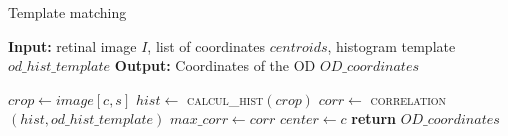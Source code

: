 \begin{algorithm}[!htbp]

	\caption{Template matching}
	\label{alg:templatematching}
	{\fontsize{10}{9.5}\selectfont
	\begin{algorithmic}[1]
		\State \textbf{Input:} retinal image $I$, list of coordinates $centroids$, histogram template $od\_hist\_template$ 
		\State \textbf{Output:} Coordinates of the OD $OD\_coordinates$
		\medbreak
		

				\State $crop \gets image[c, s]$
				\State $hist \gets$ \textsc{calcul\_hist}$(crop)$
				\State $corr \gets$ \textsc{correlation}$(hist, od\_hist\_template)$					
					\State $max\_corr \gets corr$
					\State $center \gets c$
				\EndIf
			\EndFor
			\State \textbf{return} $OD\_coordinates$
		\EndFunction
		
	\end{algorithmic}
	}
\end{algorithm}
